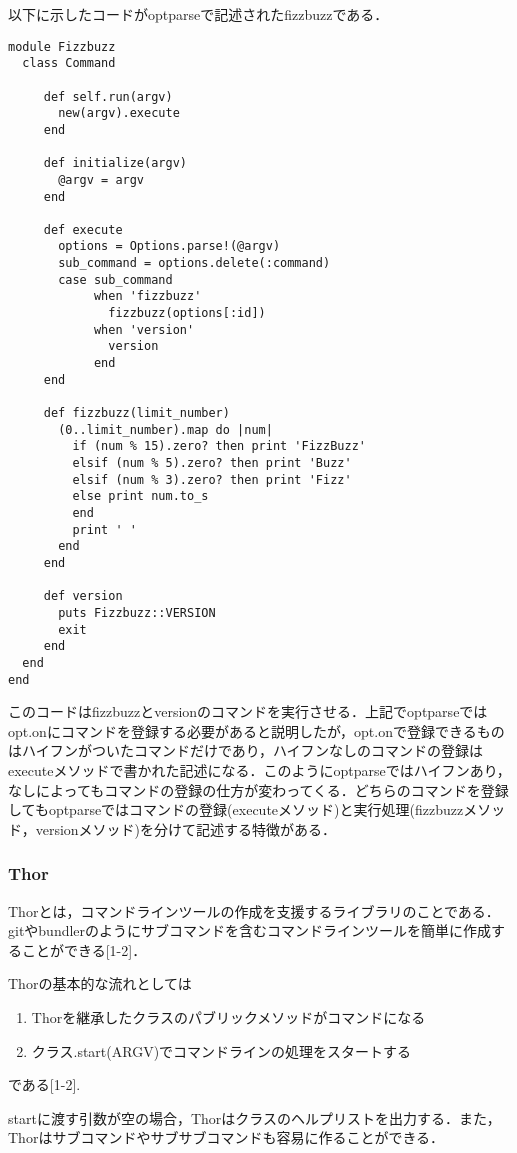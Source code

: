 以下に示したコードがoptparseで記述されたfizzbuzzである．
\begin{lstlisting}[style=customRuby,basicstyle={\scriptsize\ttfamily}]
module Fizzbuzz
  class Command

     def self.run(argv)
       new(argv).execute
     end

     def initialize(argv)
       @argv = argv
     end

     def execute
       options = Options.parse!(@argv)
       sub_command = options.delete(:command)
       case sub_command
            when 'fizzbuzz'
              fizzbuzz(options[:id])
            when 'version'
              version
            end
     end

     def fizzbuzz(limit_number)
       (0..limit_number).map do |num|
         if (num % 15).zero? then print 'FizzBuzz'
         elsif (num % 5).zero? then print 'Buzz'
         elsif (num % 3).zero? then print 'Fizz'
         else print num.to_s
         end
         print ' '
       end
     end

     def version
       puts Fizzbuzz::VERSION
       exit
     end
  end
end
\end{lstlisting}
このコードはfizzbuzzとversionのコマンドを実行させる．上記でoptparseではopt.onにコマンドを登録する必要があると説明したが，opt.onで登録できるものはハイフンがついたコマンドだけであり，ハイフンなしのコマンドの登録はexecuteメソッドで書かれた記述になる．このようにoptparseではハイフンあり，なしによってもコマンドの登録の仕方が変わってくる．どちらのコマンドを登録してもoptparseではコマンドの登録(executeメソッド)と実行処理(fizzbuzzメソッド，versionメソッド)を分けて記述する特徴がある．

\subsubsection{Thor}
Thorとは，コマンドラインツールの作成を支援するライブラリのことである．gitやbundlerのようにサブコマンドを含むコマンドラインツールを簡単に作成することができる[1-2]．

Thorの基本的な流れとしては

\begin{enumerate}
\item Thorを継承したクラスのパブリックメソッドがコマンドになる
\item クラス.start(ARGV)でコマンドラインの処理をスタートする
\end{enumerate}
である[1-2].

startに渡す引数が空の場合，Thorはクラスのヘルプリストを出力する．また，Thorはサブコマンドやサブサブコマンドも容易に作ることができる．

